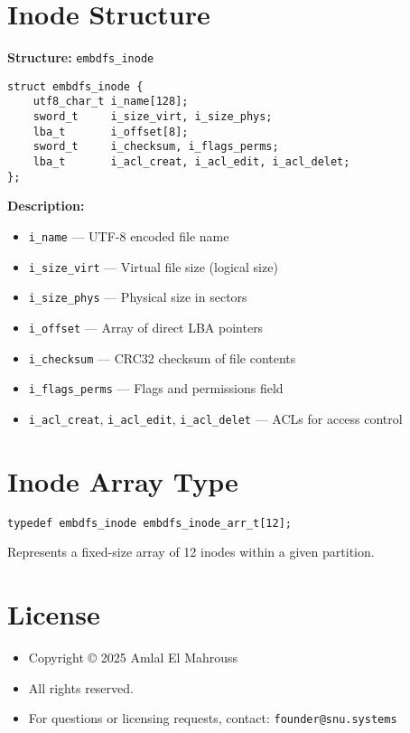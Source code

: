 \documentclass{article}
\begin{document}
\section{Inode Structure}
\textbf{Structure:} \texttt{embdfs\_inode}
\begin{lstlisting}
struct embdfs_inode {
    utf8_char_t i_name[128];
    sword_t     i_size_virt, i_size_phys;
    lba_t       i_offset[8];
    sword_t     i_checksum, i_flags_perms;
    lba_t       i_acl_creat, i_acl_edit, i_acl_delet;
};
\end{lstlisting}

\textbf{Description:}
\begin{itemize}
    \item \texttt{i\_name} — UTF-8 encoded file name
    \item \texttt{i\_size\_virt} — Virtual file size (logical size)
    \item \texttt{i\_size\_phys} — Physical size in sectors
    \item \texttt{i\_offset} — Array of direct LBA pointers
    \item \texttt{i\_checksum} — CRC32 checksum of file contents
    \item \texttt{i\_flags\_perms} — Flags and permissions field
    \item \texttt{i\_acl\_creat}, \texttt{i\_acl\_edit}, \texttt{i\_acl\_delet} — ACLs for access control
\end{itemize}

\section{Inode Array Type}
\begin{lstlisting}
typedef embdfs_inode embdfs_inode_arr_t[12];
\end{lstlisting}
Represents a fixed-size array of 12 inodes within a given partition.

\section{License}
\begin{itemize}
    \item Copyright © 2025 Amlal El Mahrouss
    \item All rights reserved.
    \item For questions or licensing requests, contact: \texttt{founder@snu.systems}
\end{itemize}
\end{document}
